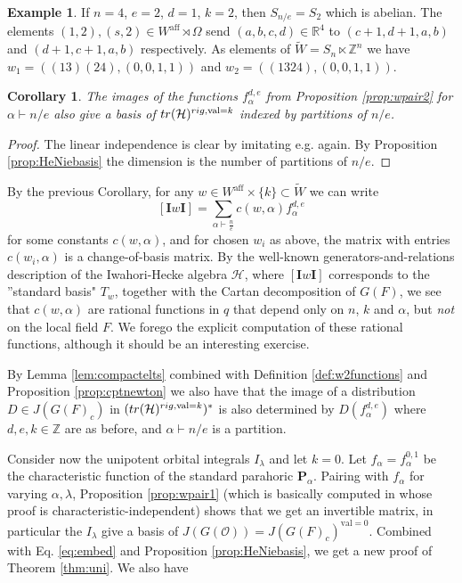 \documentclass{amsart}
\numberwithin{equation}{section}
\newtheorem{corollary}[lemma]{Corollary}%
\theoremstyle{definition}
\newtheorem{example}[lemma]{Example}%
\def\tr{{\rm tr}}
\def\val{\mathrm{val}}
\def\tilde{\widetilde}
\newcommand{\tW}{\widetilde{W}}
\newcommand{\cO}{\mathcal{O}}
\newcommand{\cH}{\mathcal{H}}
\newcommand{\bP}{\mathbf{P}}
\newcommand{\bI}{\mathbf{I}}
\newcommand{\R}{{\mathbb R}}
\newcommand{\Z}{{\mathbb Z}}
\newcommand{\aff}{\mathrm{aff}}
\begin{document}
\begin{example}
If $n=4$, $e=2$, $d=1$, $k=2$, then $S_{n/e}=S_2$ which is abelian.
The elements $(1,2), (s,2)\in W^{\aff}\rtimes \Omega$ send $(a,b,c,d)\in \R^4$ to $(c+1,d+1,a,b)$ and $(d+1,c+1,a,b)$ respectively.
As elements of $\tW=S_n\ltimes \Z^n$
we have $w_1=((13)(24),(0,0,1,1))$ and $w_2=((1324),(0,0,1,1))$.
\end{example}
\begin{corollary}
    The images of the functions $f_\alpha^{d,e}$ from Proposition \ref{prop:wpair2} for $\alpha\vdash n/e$ also give a basis of $\tr(\cH)^{rig,\val=k}$ indexed by partitions of $n/e$.
\end{corollary}
\begin{proof}
The linear independence is clear by imitating e.g. \cite[Corollaire 4.4.]{W1} again. By Proposition \ref{prop:HeNiebasis} the dimension is the number of partitions of $n/e$.
\end{proof}
By the previous Corollary, for any $w\in W^{\aff}\times\{k\}\subset\tilde{W}$ we can write
\[
[\bI w\bI]=\sum_{\alpha\vdash\frac{n}{e}}c(w,\alpha)f_{\alpha}^{d,e}
\]
for some constants $c(w,\alpha)$, and for chosen $w_i$ as above, the matrix with entries $c(w_i,\alpha)$ is a change-of-basis matrix. By the well-known generators-and-relations description of the Iwahori-Hecke algebra $\cH$, where $[\bI w\bI]$ corresponds to the ''standard basis" $T_w$, together with the Cartan decomposition of $G(F)$, we see that $c(w,\alpha)$ are rational functions in $q$ that depend only on $n$, $k$ and $\alpha$, but {\em not} on the local field $F$. We forego the explicit computation of these rational functions, although it should be an interesting exercise.

By Lemma \ref{lem:compactelts} combined with Definition \ref{def:w2functions} and Proposition \ref{prop:cptnewton} we also have that the image of a distribution $D\in J(G(F)_c)$ in $(\tr(\cH)^{rig,\val=k})^*$ is also determined by $D(f^{d,e}_\alpha)$ where $d, e, k\in \Z$ are as before, and $\alpha\vdash n/e$ is a partition. 

Consider now the unipotent orbital integrals $I_\lambda$ and let $k=0$. Let $f_\alpha=f^{0,1}_\alpha$ be the characteristic function of the standard parahoric $\bP_\alpha$. Pairing with $f_{\alpha}$ for varying $\alpha, \lambda$, Proposition \ref{prop:wpair1} (which is basically computed in \cite[Proposition 4.2]{W1} whose proof is characteristic-independent) shows that we get an invertible matrix, in particular the $I_\lambda$ give a basis of $J(G(\cO))=J(G(F)_c)^{\val=0}$. Combined with Eq. \eqref{eq:embed} and Proposition \ref{prop:HeNiebasis}, we get a new proof of Theorem \ref{thm:uni}. We also have
\end{document}
